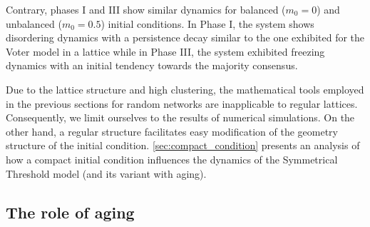 	Contrary, phases I and III show similar dynamics for balanced ($m_0 = 0$) and unbalanced ($m_0 = 0.5$) initial conditions. In Phase I, the system shows disordering dynamics with a persistence decay similar to the one exhibited for the Voter model in a lattice \cite{ben-naim-1996} while in Phase III, the system exhibited freezing dynamics with an initial tendency towards the majority consensus.
	
	Due to the lattice structure and high clustering, the mathematical tools employed in the previous sections for random networks are inapplicable to regular lattices. Consequently, we limit ourselves to the results of numerical simulations. On the other hand, a regular structure facilitates easy modification of the geometry structure of the initial condition. \ref{sec:compact_condition} presents an analysis of how a compact initial condition influences the dynamics of the Symmetrical Threshold model (and its variant with aging).
	
	
	\subsection{The role of aging}
	
